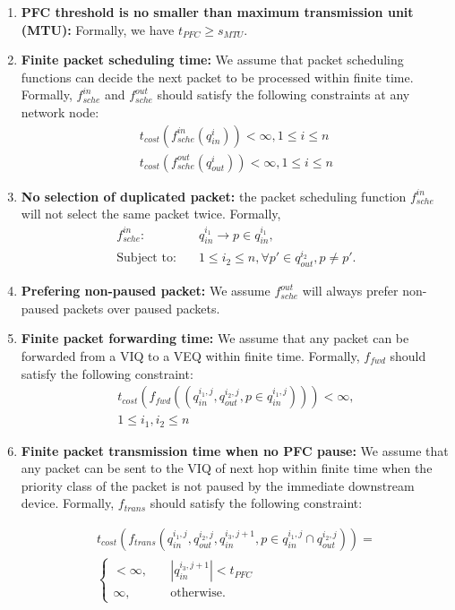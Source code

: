 \begin{enumerate}
	\item \textbf{PFC threshold is no smaller than maximum transmission unit (MTU):} Formally, we have $t_{PFC}\ge s_{MTU}$.
	
	\item \textbf{Finite packet scheduling time:} We assume that packet scheduling functions can decide the next packet to be processed within finite time. Formally, $f^{in}_{sche}$ and $f^{out}_{sche}$ should satisfy the following constraints at any network node:
		\begin{align} 
    	t_{cost}(f^{in}_{sche}(q_{in}^{i})) < \infty ,1\leq i \leq n \label{eqn:schecon1}\\
	    t_{cost}(f^{out}_{sche}(q_{out}^{i})) < \infty, 1\leq i \leq n \label{eqn:schecon2}
		\end{align}
		
	\item \textbf{No selection of duplicated packet:} the packet scheduling function $f^{in}_{sche}$ will not select the same packet twice. Formally, 
		\begin{align} \label{eqn:nodupschedule}
		f^{in}_{sche}: \quad& q_{in}^{i_1} \longrightarrow p \in q_{in}^{i_1}, \nonumber \\
		\mbox{Subject to}: \quad&1\leq i_2 \leq n, \forall p\prime \in q_{out}^{i_2}, p \neq p\prime .
		\end{align}
		
	\item \textbf{Prefering non-paused packet:} We assume $f^{out}_{sche}$ will always prefer non-paused packets over paused packets.
		
	\item \textbf{Finite packet forwarding time:} We assume that any packet can be forwarded from a VIQ to a VEQ within finite time. Formally, $f_{fwd}$ should satisfy the following constraint:
	    \begin{align} \label{eqn:fwdcon}
		t_{cost}(f_{fwd}((q_{in}^{i_1,j}, q_{out}^{i_2,j}, p\in q_{in}^{i_1,j}))) < \infty, \nonumber \\
		1\leq i_1, i_2 \leq n
		\end{align}
		
	\item \textbf{Finite packet transmission time when no PFC pause:} We assume that any packet can be sent to the VIQ of next hop within finite time when the priority class of the packet is not paused by the immediate downstream device. Formally, $f_{trans}$ should satisfy the following constraint:
	
	\begin{align} \label{eqn:transcon}
	t_{cost}(f_{trans}(q_{in}^{i_1, j}, q_{out}^{i_2, j}, q_{in}^{i_3, j+1}, p\in q_{in}^{i_1,j}\cap q_{out}^{i_2,j}))= \nonumber \\
	\begin{cases}
	<\infty, &\quad |q_{in}^{i_3,j+1}|< t_{PFC}\\
	\infty, &\quad\text{otherwise.} \ 
	\end{cases}
	\end{align}
	
    \end{enumerate}
    
